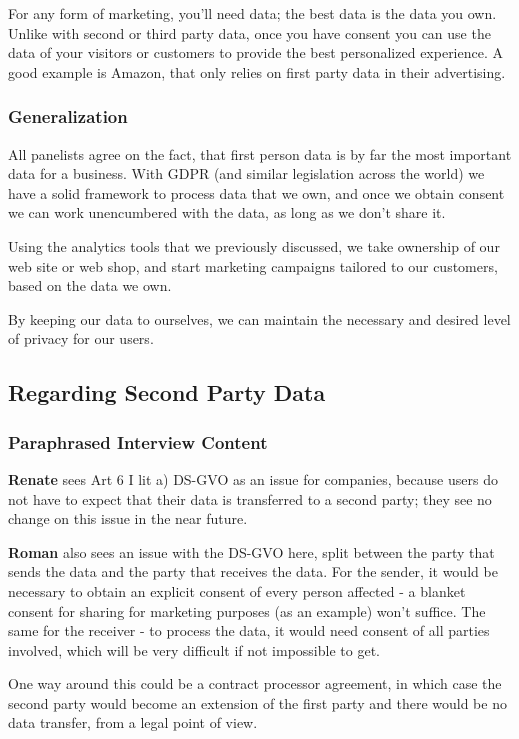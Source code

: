 For any form of marketing, you'll need data; the best data is the data you own. Unlike with second or third party data, once you have consent you can use the data of your visitors or customers to provide the best personalized experience. A good example is Amazon, that only relies on first party data in their advertising.

\subsubsection{Generalization}

All panelists agree on the fact, that first person data is by far the most important data for a business. With GDPR (and similar legislation across the world) we have a solid framework to process data that we own, and once we obtain consent we can work unencumbered with the data, as long as we don't share it.

Using the analytics tools that we previously discussed, we take ownership of our web site or web shop, and start marketing campaigns tailored to our customers, based on the data we own. 

By keeping our data to ourselves, we can maintain the necessary and desired level of privacy for our users.

\subsection{Regarding Second Party Data}

\subsubsection{Paraphrased Interview Content}

\textbf{Renate} sees Art 6 I lit a) DS-GVO as an issue for companies, because users do not have to expect that their data is transferred to a second party; they see no change on this issue in the near future.

\textbf{Roman} also sees an issue with the DS-GVO here, split between the party that sends the data and the party that receives the data. For the sender, it would be necessary to obtain an explicit consent of every person affected - a blanket consent for sharing for marketing purposes (as an example) won't suffice. The same for the receiver - to process the data, it would need consent of all parties involved, which will be very difficult if not impossible to get.

One way around this could be a contract processor agreement, in which case the second party would become an extension of the first party and there would be no data transfer, from a legal point of view.

